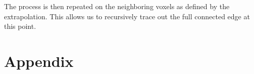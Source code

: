 \documentclass{article}
\begin{document}
The process is then repeated on the neighboring voxels as defined by the extrapolation.
This allows us to recursively trace out the full connected edge at this point.





\section*{Appendix}

% 

{}

\end{document}
